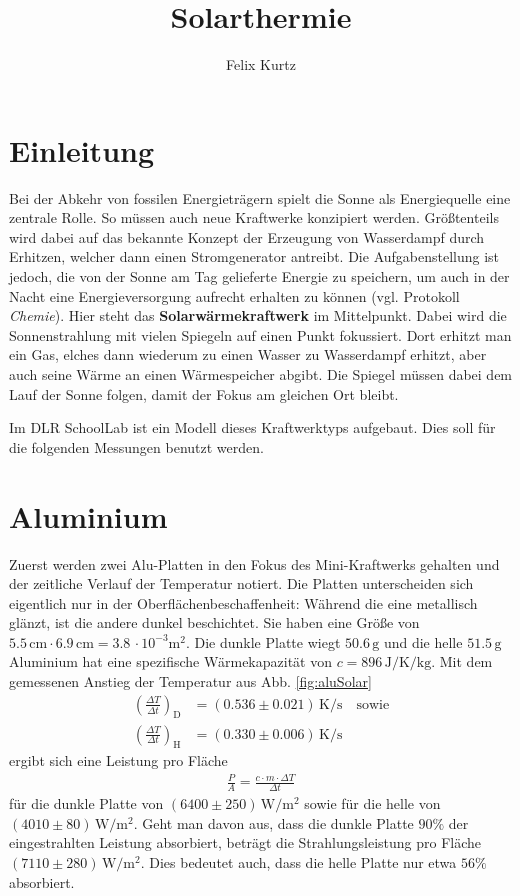 \documentclass[12pt,a4paper,headinclude,bibtotoc]{scrartcl}
\begin{document}
\title{Solarthermie}
\author{Felix Kurtz}
\maketitle

\section{Einleitung}
Bei der Abkehr von fossilen Energieträgern spielt die Sonne als Energiequelle eine zentrale Rolle.
So müssen auch neue Kraftwerke konzipiert werden.
Größtenteils wird dabei auf das bekannte Konzept der Erzeugung von Wasserdampf durch Erhitzen, welcher dann einen Stromgenerator antreibt.
Die Aufgabenstellung ist jedoch, die von der Sonne am Tag gelieferte Energie zu speichern, um auch in der Nacht eine Energieversorgung aufrecht erhalten zu können (vgl. Protokoll \textit{Chemie}).
Hier steht das \textbf{Solarwärmekraftwerk} im Mittelpunkt.
Dabei wird die Sonnenstrahlung mit vielen Spiegeln auf einen Punkt fokussiert.
Dort erhitzt man ein Gas, elches dann wiederum zu einen Wasser zu Wasserdampf erhitzt, aber auch seine Wärme an einen Wärmespeicher abgibt.
Die Spiegel müssen dabei dem Lauf der Sonne folgen, damit der Fokus am gleichen Ort bleibt.

Im DLR SchoolLab ist ein Modell dieses Kraftwerktyps aufgebaut.
Dies soll für die folgenden Messungen benutzt werden.

\section{Aluminium}
Zuerst werden zwei Alu-Platten in den Fokus des Mini-Kraftwerks gehalten und der zeitliche Verlauf der Temperatur notiert.
Die Platten unterscheiden sich eigentlich nur in der Oberflächenbeschaffenheit:
Während die eine metallisch glänzt, ist die andere dunkel beschichtet.
Sie haben eine Größe von $5.5\,\si{\centi\meter}\cdot 6.9\,\si{\centi\meter}=3.8\,\cdot 10^{-3}\si\meter^2$.
Die dunkle Platte wiegt $50.6\,\si\gram$ und die helle $51.5\,\si\gram$
Aluminium hat eine spezifische Wärmekapazität von $c=896\,\si{\joule\per\kelvin\per\kilo\gram}$.
Mit dem gemessenen Anstieg der Temperatur aus Abb. \ref{fig:aluSolar}
\begin{align*}
	\left(\frac{\Delta T}{\Delta t}\right)_\text{D} &= (0.536 \pm 0.021)\,\si{\kelvin\per\second}\quad \text{sowie}\\
	\left(\frac{\Delta T}{\Delta t}\right)_\text{H} &= (0.330 \pm 0.006)\,\si{\kelvin\per\second}
\end{align*}
ergibt sich eine Leistung pro Fläche
\begin{align*}
	\frac{P}{A}=\frac{c\cdot m\cdot\Delta T}{\Delta t}
\end{align*}
für die dunkle Platte von $(6400 \pm 250)\,\si{\watt\per\meter^2}$ sowie für die helle von $(4010 \pm 80)\,\si{\watt\per\meter^2}$.
Geht man davon aus, dass die dunkle Platte $90\%$ der eingestrahlten Leistung absorbiert, beträgt die Strahlungsleistung pro Fläche $(7110 \pm 280)\,\si{\watt\per\meter^2}$.
Dies bedeutet auch, dass die helle Platte nur etwa $56\%$ absorbiert.
\end{document}
